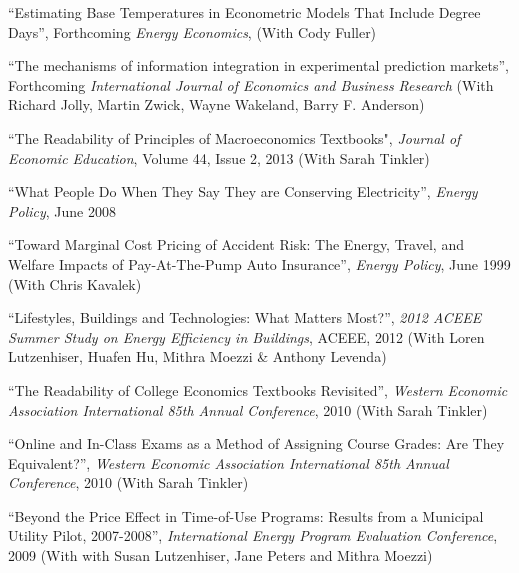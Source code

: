 \documentclass[Computer Science]{vita}
\begin{document}
\begin{vita}
\begin{Publications}
\begin{Papers in Refereed Journals}
    \item ``Estimating Base Temperatures in Econometric Models That Include Degree Days'', Forthcoming \emph{Energy Economics},  (With Cody Fuller)
    
\item ``The mechanisms of information integration in experimental prediction markets'', Forthcoming \emph{International Journal of Economics and Business Research} (With Richard Jolly, Martin Zwick, Wayne Wakeland, Barry F. Anderson)
    
    \item ``The Readability of Principles of Macroeconomics Textbooks", \emph{Journal of Economic Education}, Volume 44, Issue 2, 2013 (With Sarah Tinkler) 
    
    \item ``What People Do When They Say They are Conserving Electricity'', \emph{Energy Policy}, June 2008

    \item ``Toward Marginal Cost Pricing of Accident Risk: The Energy,
      Travel, and Welfare Impacts of Pay-At-The-Pump Auto Insurance'',
      \emph{Energy Policy}, June 1999 (With Chris Kavalek)

    \end{Papers in Refereed Journals}

    \begin{Papers at Refereed Conferences}
    
\item ``Lifestyles, Buildings and Technologies: What Matters Most?'', \emph{2012 ACEEE Summer Study
        on Energy Efficiency in Buildings}, ACEEE, 2012 (With Loren Lutzenhiser, Huafen Hu, Mithra Moezzi \& Anthony Levenda)

    \item ``The Readability of College Economics Textbooks Revisited'', \emph{Western Economic Association International
        85th Annual Conference}, 2010 (With Sarah Tinkler)

    \item ``Online and In-Class Exams as a Method of Assigning Course Grades: 
Are They Equivalent?'', \emph{Western Economic Association International
        85th Annual Conference}, 2010 (With Sarah Tinkler)

    \item ``Beyond the Price Effect in Time-of-Use Programs: Results
      from a Municipal Utility Pilot, 2007-2008'', \emph{International
        Energy Program Evaluation Conference}, 2009 (With with Susan
      Lutzenhiser, Jane Peters and Mithra Moezzi)


\end{Papers at Refereed Conferences}
\end{Publications}
\end{vita}
\end{document}
